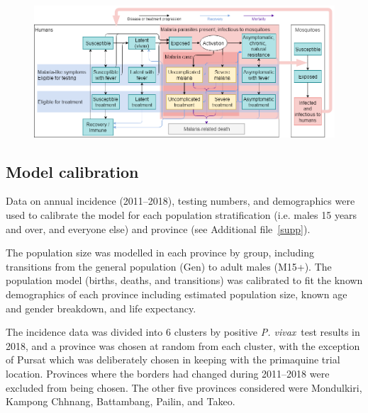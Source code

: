 \documentclass[doublespacing]{bmcart}
\newcommand{\pv}{\textit{P. vivax}}
\begin{document}
\begin{figure}[h!]
\includegraphics[width=.95\linewidth]{Optima_Malaria_model_diagram.png}\label{fig:model_flow}\caption{}
\end{figure}


\subsection*{Model calibration} \label{sec:calibration} %

Data on annual incidence (2011--2018), testing numbers, and demographics were used to calibrate the model for each population stratification (i.e. males 15 years and over, and everyone else) and province (see Additional file~\ref{supp}). 

The population size was modelled in each province by group, including transitions from the general population (Gen) to adult males (M15+). The population model (births, deaths, and transitions) was calibrated to fit the known demographics of each province including estimated population size, known age and gender breakdown, and life expectancy.

The incidence data was divided into 6 clusters by positive \pv~test results in 2018, and a province was chosen at random from each cluster, with the exception of Pursat which was deliberately chosen in keeping with the primaquine trial location. Provinces where the borders had changed during 2011--2018 were excluded from being chosen. The other five provinces considered were Mondulkiri, Kampong Chhnang, Battambang, Pailin, and Takeo. 
\end{document}
